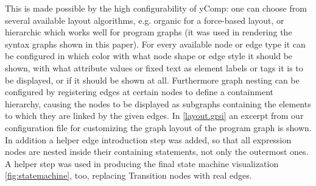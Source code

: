 \documentclass[copyright]{eptcs}
\begin{document}
This is made possible by the high configurability of yComp:
one can choose from several available layout algorithms, e.g. organic for a force-based layout, or hierarchic which works well for program graphs (it was used in rendering the syntax graphs shown in this paper).
For every available node or edge type it can be configured in which color with what node shape or edge style it should be shown, with what attribute values or fixed text as element labels or tags it is to be displayed, or if it should be shown at all.
Furthermore graph nesting can be configured by registering edges at certain nodes to define a containment hierarchy, causing the nodes to be displayed as subgraphs containing the elements to which they are linked by the given edges.
In \autoref{layout.grsi} an excerpt from our configuration file for customizing the graph layout of the program graph is shown.
In addition a helper edge introduction step was added, so that all expression nodes are nested inside their containing statements, not only the outermost ones.
A helper step was used in producing the final state machine visualization \autoref{fig:statemachine}, too, replacing Transition nodes with real edges.
\end{document}
